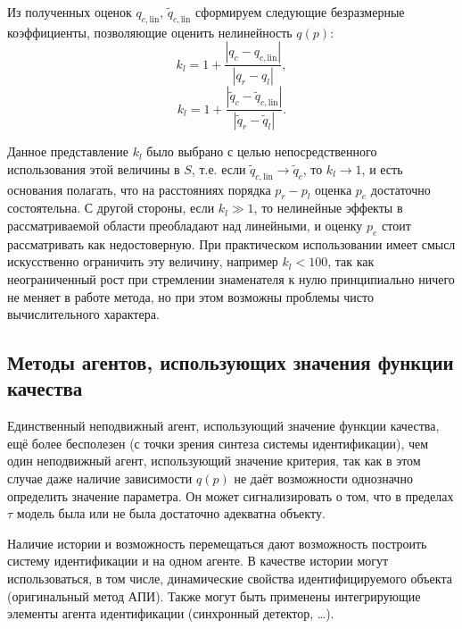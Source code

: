 Из полученных оценок $q_{c,\mathrm{lin}}$, $\tilde{q}_{c,\mathrm{lin}}$
сформируем следующие безразмерные коэффициенты, позволяющие оценить
нелинейность $q(p)$:
%
\begin{equation}
  k_l = 1 + \frac{|q_c - q_{c,\mathrm{lin}}|}{|q_r-q_l|} ,
  \label{atu:eq:k_l1}
\end{equation}
%
\begin{equation}
  k_l = 1 + \frac{|\tilde{q}_c - \tilde{q}_{c,\mathrm{lin}}|}{ |\tilde{q}_r-\tilde{q}_l|} .
  \label{atu:eq:k_l2}
\end{equation}

Данное представление $k_l$ было выбрано с целью непосредственного использования
этой величины в $S$, т.е. если $\tilde{q}_{c,\mathrm{lin}} \to \tilde{q}_c$,
то $k_l \to 1$, и есть основания полагать, что на расстояниях порядка $p_r-p_l$
оценка $p_e$ достаточно состоятельна. С другой стороны,
если $k_l \gg 1 $, то нелинейные эффекты в рассматриваемой области
преобладают над линейными, и оценку $p_e$  стоит рассматривать как недостоверную.
При практическом использовании имеет смысл искусственно ограничить эту величину,
например $k_l < 100 $, так как неограниченный рост при стремлении знаменателя
к нулю принципиально ничего не меняет в работе метода, но при этом
возможны проблемы чисто вычислительного характера.






\subsection{Методы агентов, использующих значения функции качества }  %

Единственный неподвижный агент,
использующий значение функции качества,
ещё более бесполезен (с точки зрения синтеза системы идентификации),
чем один неподвижный агент,
использующий значение критерия, так как в этом случае даже наличие
зависимости $q(p)$ не даёт возможности однозначно определить
значение параметра.
Он может сигнализировать о том, что в пределах
\(\tau\) модель была или не была достаточно адекватна
объекту.




Наличие истории и возможность перемещаться дают возможность
построить систему идентификации и на одном агенте.
В качестве истории могут использоваться, в том числе,
динамические свойства идентифицируемого объекта
(оригинальный метод АПИ). Также могут быть
применены интегрирующие элементы агента идентификации
(синхронный детектор, \ldots).

